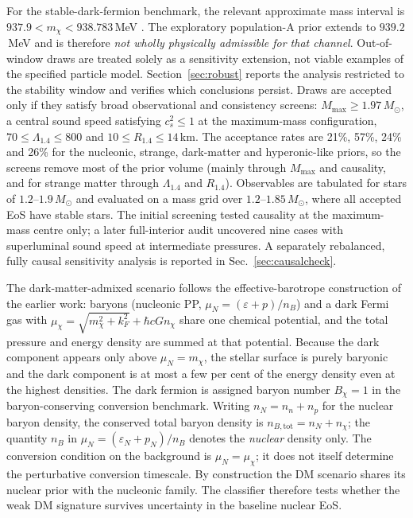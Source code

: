 \documentclass[11pt,a4paper]{article}
\newcommand{\Msun}{M_\odot}
\begin{document}
For the stable-dark-fermion benchmark, the relevant approximate mass interval is $937.9<m_\chi<938.783$\,MeV \citep{FG18}. The exploratory population-A prior extends to $939.2$\,MeV and is therefore \emph{not wholly physically admissible for that channel}. Out-of-window draws are treated solely as a sensitivity extension, not viable examples of the specified particle model. Section~\ref{sec:robust} reports the analysis restricted to the stability window and verifies which conclusions persist.
Draws are accepted only if they satisfy broad observational and consistency screens: $M_{\max}\ge1.97\,\Msun$, a central sound speed satisfying $c_s^2\le1$ at the maximum-mass configuration, $70\le\Lambda_{1.4}\le800$ and $10\le R_{1.4}\le14$\,km. The acceptance rates are 21\%, 57\%, 24\% and 26\% for the nucleonic, strange, dark-matter and hyperonic-like priors, so the screens remove most of the prior volume (mainly through $M_{\max}$ and causality, and for strange matter through $\Lambda_{1.4}$ and $R_{1.4}$). Observables are tabulated for stars of $1.2$--$1.9\,\Msun$ and evaluated on a mass grid over $1.2$--$1.85\,\Msun$, where all accepted EoS have stable stars. The initial screening tested causality at the maximum-mass centre only; a later full-interior audit uncovered nine cases with superluminal sound speed at intermediate pressures. A separately rebalanced, fully causal sensitivity analysis is reported in Sec.~\ref{sec:causalcheck}.

The dark-matter-admixed scenario follows the effective-barotrope construction of the earlier work: baryons (nucleonic PP, $\mu_N=(\varepsilon+p)/n_B$) and a dark Fermi gas with $\mu_\chi=\sqrt{m_\chi^2+k_F^2}+\hbar cGn_\chi$ share one chemical potential, and the total pressure and energy density are summed at that potential. Because the dark component appears only above $\mu_N=m_\chi$, the stellar surface is purely baryonic and the dark component is at most a few per cent of the energy density even at the highest densities. The dark fermion is assigned baryon number $B_\chi=1$ in the baryon-conserving conversion benchmark. Writing $n_N=n_n+n_p$ for the nuclear baryon density, the conserved total baryon density is $n_{B,\mathrm{tot}}=n_N+n_\chi$; the quantity $n_B$ in $\mu_N=(\varepsilon_N+p_N)/n_B$ denotes the \emph{nuclear} density only. The conversion condition on the background is $\mu_N=\mu_\chi$; it does not itself determine the perturbative conversion timescale. By construction the DM scenario shares its nuclear prior with the nucleonic family. The classifier therefore tests whether the weak DM signature survives uncertainty in the baseline nuclear EoS.
\end{document}

